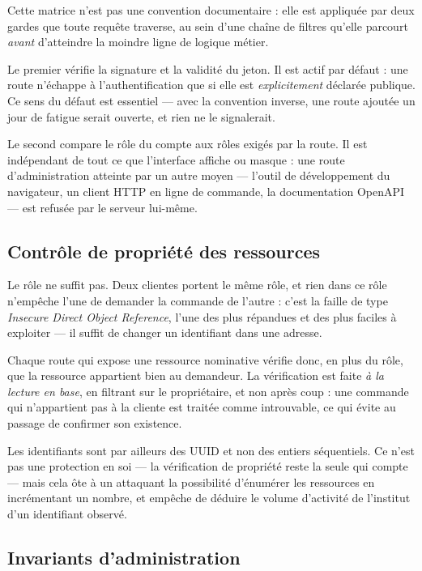 Cette matrice n'est pas une convention documentaire : elle est appliquée par
deux gardes que toute requête traverse, au sein d'une chaîne de filtres qu'elle
parcourt \emph{avant} d'atteindre la moindre ligne de logique métier.


Le premier vérifie la signature et la validité du jeton. Il est actif par
défaut : une route n'échappe à l'authentification que si elle est
\emph{explicitement} déclarée publique. Ce sens du défaut est essentiel ---
avec la convention inverse, une route ajoutée un jour de fatigue serait
ouverte, et rien ne le signalerait.

Le second compare le rôle du compte aux rôles exigés par la route. Il est
indépendant de tout ce que l'interface affiche ou masque : une route
d'administration atteinte par un autre moyen --- l'outil de développement du
navigateur, un client HTTP en ligne de commande, la documentation OpenAPI ---
est refusée par le serveur lui-même.

\subsection{Contrôle de propriété des ressources}

Le rôle ne suffit pas. Deux clientes portent le même rôle, et rien dans ce rôle
n'empêche l'une de demander la commande de l'autre : c'est la faille de type
\textit{Insecure Direct Object Reference}, l'une des plus répandues et des plus
faciles à exploiter --- il suffit de changer un identifiant dans une adresse.

Chaque route qui expose une ressource nominative vérifie donc, en plus du rôle,
que la ressource appartient bien au demandeur. La vérification est faite
\emph{à la lecture en base}, en filtrant sur le propriétaire, et non après
coup : une commande qui n'appartient pas à la cliente est traitée comme
introuvable, ce qui évite au passage de confirmer son existence.

Les identifiants sont par ailleurs des UUID et non des entiers séquentiels. Ce
n'est pas une protection en soi --- la vérification de propriété reste la seule
qui compte --- mais cela ôte à un attaquant la possibilité d'énumérer les
ressources en incrémentant un nombre, et empêche de déduire le volume
d'activité de l'institut d'un identifiant observé.

\subsection{Invariants d'administration}

